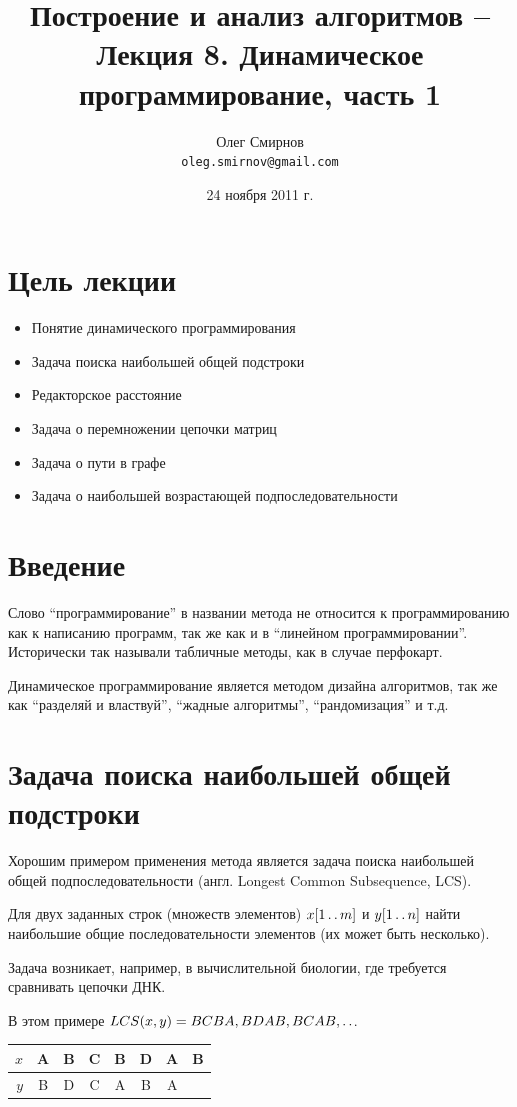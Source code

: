 \documentclass[a4paper,11pt]{article}
\author{Олег Смирнов\\
\texttt{oleg.smirnov@gmail.com}}
\date{24 ноября 2011 г.}
\title{Построение и анализ алгоритмов -- Лекция 8. Динамическое программирование, часть 1}
\begin{document}
\maketitle
\tableofcontents
\newpage

\setlength{\parskip}{1ex plus 0.5ex minus 0.2ex}

\section*{Цель лекции}
\begin{itemize}
\item Понятие динамического программирования
\item Задача поиска наибольшей общей подстроки
\item Редакторское расстояние
\item Задача о перемножении цепочки матриц
\item Задача о пути в графе
\item Задача о наибольшей возрастающей подпоследовательности
\end{itemize}

\section{Введение}
Слово ``программирование'' в названии метода не относится к программированию как
к написанию программ, так же как и в ``линейном программировании''. Исторически
так называли табличные методы, как в случае перфокарт.

Динамическое программирование является методом дизайна алгоритмов, так же как
``разделяй и властвуй'', ``жадные алгоритмы'', ``рандомизация'' и т.д.

\section{Задача поиска наибольшей общей подстроки}
Хорошим примером применения метода является задача поиска наибольшей общей
подпоследовательности (англ. Longest Common Subsequence, LCS).

Для двух заданных строк (множеств элементов) $x[1 \mathinner{\ldotp\ldotp} m]$ и $y[1 \mathinner{\ldotp\ldotp} n]$
найти наибольшие общие последовательности элементов (их может быть несколько).

Задача возникает, например, в вычислительной биологии, где требуется сравнивать
цепочки ДНК.

В этом примере $LCS(x, y) = BCBA, BDAB, BCAB, \mathinner{\ldotp\ldotp}$.
\begin{center}
\begin{tabular}{|r|c|c|c|c|c|c|c|}
  \hline
     $x$ & A & B & C & B & D & A & B \\
  \hline
     $y$ & B & D & C & A & B & A &   \\
  \hline
\end{tabular}
\end{center}
\end{document}
